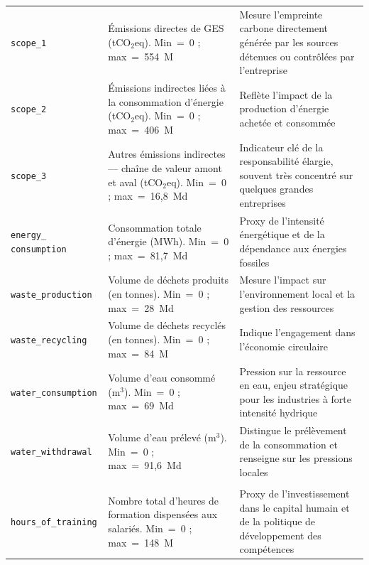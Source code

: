 \begin{longtable}{>{\raggedright\arraybackslash}p{}
                  >{\raggedright\arraybackslash}p{}
                  >{\raggedright\arraybackslash}p{}}
\midrule

\multicolumn{3}{l}{\textbf{Pilier Environnemental (E)}} \\
\midrule

\texttt{scope\_1} & Émissions directes de GES (tCO$_2$eq). Min~=~0 ; max~=~554~M & Mesure l'empreinte carbone directement générée par les sources détenues ou contrôlées par l'entreprise \\
\midrule
\texttt{scope\_2} & Émissions indirectes liées à la consommation d'énergie (tCO$_2$eq). Min~=~0 ; max~=~406~M & Reflète l'impact de la production d'énergie achetée et consommée \\
\midrule
\texttt{scope\_3} & Autres émissions indirectes — chaîne de valeur amont et aval (tCO$_2$eq). Min~=~0 ; max~=~16,8~Md & Indicateur clé de la responsabilité élargie, souvent très concentré sur quelques grandes entreprises \\
\midrule
\texttt{energy\_} \newline \texttt{consumption} & Consommation totale d'énergie (MWh). Min~=~0 ; max~=~81,7~Md & Proxy de l'intensité énergétique et de la dépendance aux énergies fossiles \\
\midrule
\texttt{waste\_production} & Volume de déchets produits (en tonnes). Min~=~0 ; max~=~28~Md & Mesure l'impact sur l'environnement local et la gestion des ressources \\
\midrule
\texttt{waste\_recycling} & Volume de déchets recyclés (en tonnes). Min~=~0 ; max~=~84~M & Indique l'engagement dans l'économie circulaire \\
\midrule
\texttt{water\_consumption} & Volume d'eau consommé (m$^3$). Min~=~0 ; max~=~69~Md & Pression sur la ressource en eau, enjeu stratégique pour les industries à forte intensité hydrique \\
\midrule
\texttt{water\_withdrawal} & Volume d'eau prélevé (m$^3$). Min~=~0 ; max~=~91,6~Md & Distingue le prélèvement de la consommation et renseigne sur les pressions locales \\

\midrule
\multicolumn{3}{l}{\textbf{Pilier Social (S)}} \\
\midrule

\texttt{hours\_of\_training} & Nombre total d'heures de formation dispensées aux salariés. Min~=~0 ; max~=~148~M & Proxy de l'investissement dans le capital humain et de la politique de développement des compétences \\


\end{longtable}

